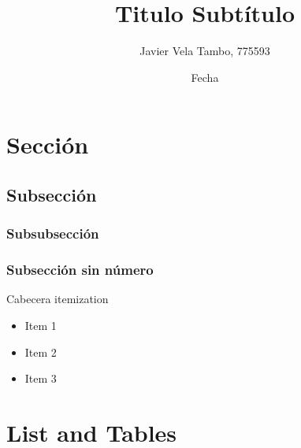 \documentclass{article}
\title{
\Huge{Titulo} %
\linebreak
\linebreak
\Large{Subtítulo}} %
\author{Javier Vela Tambo, 775593}
\date{Fecha}
\begin{document}

\maketitle %

\pagebreak %

\tableofcontents %

\pagebreak 

\section{Sección} %

\subsection{Subsección} %

\subsubsection{Subsubsección} %

\subsubsection*{Subsección sin número} %

Cabecera itemization    
\setlength{\parskip}{0em}
\begin{itemize}
    \setlength{\itemsep}{0em}
    \item Item 1
    \item Item 2
    \item Item 3 
\end{itemize}
\setlength{\parskip}{1em}

\section{List and Tables}

\end{document}
